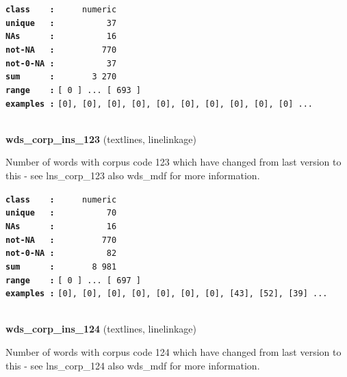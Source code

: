 \documentclass[]{article}
\begin{document}
\textbf{\texttt{class\ \ \ \ :}} \texttt{~~~~~numeric}\\
\textbf{\texttt{unique\ \ \ :}} \texttt{~~~~~~~~~~37}\\
\textbf{\texttt{NAs\ \ \ \ \ \ :}} \texttt{~~~~~~~~~~16}\\
\textbf{\texttt{not-NA\ \ \ :}} \texttt{~~~~~~~~~770}\\
\textbf{\texttt{not-0-NA\ :}} \texttt{~~~~~~~~~~37}\\
\textbf{\texttt{sum\ \ \ \ \ \ :}} \texttt{~~~~~~~3~270}\\
\textbf{\texttt{range\ \ \ \ :}}
\texttt{{[}\ 0\ {]}\ ...\ {[}\ 693\ {]}}\\
\textbf{\texttt{examples\ :}}
\texttt{{[}0{]},\ {[}0{]},\ {[}0{]},\ {[}0{]},\ {[}0{]},\ {[}0{]},\ {[}0{]},\ {[}0{]},\ {[}0{]},\ {[}0{]}\ ...}\\

~

\textbf{wds\_corp\_ins\_123} (textlines, linelinkage)

Number of words with corpus code 123 which have changed from last
version to this - see lns\_corp\_123 also wds\_mdf for more information.

\textbf{\texttt{class\ \ \ \ :}} \texttt{~~~~~numeric}\\
\textbf{\texttt{unique\ \ \ :}} \texttt{~~~~~~~~~~70}\\
\textbf{\texttt{NAs\ \ \ \ \ \ :}} \texttt{~~~~~~~~~~16}\\
\textbf{\texttt{not-NA\ \ \ :}} \texttt{~~~~~~~~~770}\\
\textbf{\texttt{not-0-NA\ :}} \texttt{~~~~~~~~~~82}\\
\textbf{\texttt{sum\ \ \ \ \ \ :}} \texttt{~~~~~~~8~981}\\
\textbf{\texttt{range\ \ \ \ :}}
\texttt{{[}\ 0\ {]}\ ...\ {[}\ 697\ {]}}\\
\textbf{\texttt{examples\ :}}
\texttt{{[}0{]},\ {[}0{]},\ {[}0{]},\ {[}0{]},\ {[}0{]},\ {[}0{]},\ {[}0{]},\ {[}43{]},\ {[}52{]},\ {[}39{]}\ ...}\\

~

\textbf{wds\_corp\_ins\_124} (textlines, linelinkage)

Number of words with corpus code 124 which have changed from last
version to this - see lns\_corp\_124 also wds\_mdf for more information.
\end{document}
